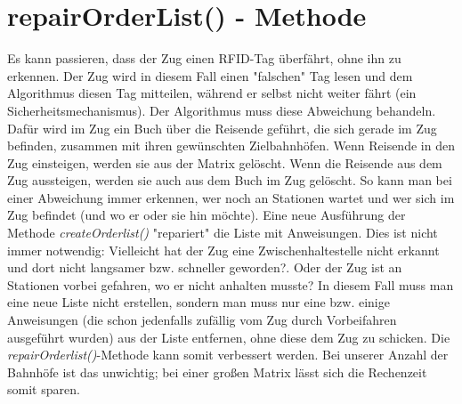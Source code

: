 \section{repairOrderList() - Methode}
Es kann passieren, dass der Zug einen RFID-Tag überfährt, ohne ihn zu erkennen. Der Zug wird in diesem Fall einen "falschen" Tag lesen und dem Algorithmus diesen Tag mitteilen, während er selbst nicht weiter fährt (ein Sicherheitsmechanismus). Der Algorithmus muss diese Abweichung behandeln. Dafür wird im Zug ein Buch über die Reisende geführt, die sich gerade im Zug befinden, zusammen mit ihren gewünschten Zielbahnhöfen. Wenn Reisende in den Zug einsteigen, werden sie aus der Matrix gelöscht. Wenn die Reisende aus dem Zug aussteigen, werden sie auch aus dem Buch im Zug gelöscht. So kann man bei einer Abweichung immer erkennen, wer noch an Stationen wartet und wer sich im Zug befindet (und wo er oder sie hin möchte). Eine neue Ausführung der Methode \textit{createOrderlist()} "repariert" die Liste mit Anweisungen. Dies ist nicht immer notwendig: Vielleicht hat der Zug eine Zwischenhaltestelle nicht erkannt und dort nicht langsamer bzw. schneller geworden?. Oder der Zug ist an Stationen vorbei gefahren, wo er nicht anhalten musste? In diesem Fall muss man eine neue Liste nicht erstellen, sondern man muss nur eine bzw. einige Anweisungen (die schon jedenfalls zufällig vom Zug durch Vorbeifahren ausgeführt wurden) aus der Liste entfernen, ohne diese dem Zug zu schicken. Die \textit{repairOrderlist()}-Methode kann somit verbessert werden. Bei unserer Anzahl der Bahnhöfe ist das unwichtig; bei einer großen Matrix lässt sich die Rechenzeit somit sparen.\\




